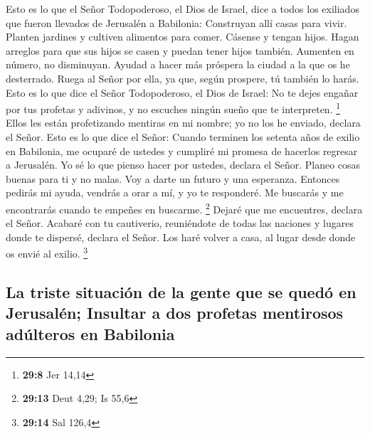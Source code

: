  Esto es lo que el Señor Todopoderoso, el Dios de Israel,
dice a todos los exiliados que fueron llevados de Jerusalén a Babilonia:
 Construyan allí casas para vivir. Planten jardines y
cultiven alimentos para comer.  Cásense y tengan hijos.
Hagan arreglos para que sus hijos se casen y puedan tener hijos también.
Aumenten en número, no disminuyan.  Ayudad a hacer más
próspera la ciudad a la que os he desterrado. Ruega al Señor por ella,
ya que, según prospere, tú también lo harás.  Esto es lo
que dice el Señor Todopoderoso, el Dios de Israel: No te dejes engañar
por tus profetas y adivinos, y no escuches ningún sueño que te
interpreten. \footnote{\textbf{29:8} Jer 14,14}  Ellos les
están profetizando mentiras en mi nombre; yo no los he enviado, declara
el Señor.  Esto es lo que dice el Señor: Cuando terminen
los setenta años de exilio en Babilonia, me ocuparé de ustedes y
cumpliré mi promesa de hacerlos regresar a Jerusalén.  Yo
sé lo que pienso hacer por ustedes, declara el Señor. Planeo cosas
buenas para ti y no malas. Voy a darte un futuro y una esperanza.
 Entonces pedirás mi ayuda, vendrás a orar a mí, y yo te
responderé.  Me buscarás y me encontrarás cuando te
empeñes en buscarme. \footnote{\textbf{29:13} Deut 4,29; Is 55,6}
 Dejaré que me encuentres, declara el Señor. Acabaré con
tu cautiverio, reuniéndote de todas las naciones y lugares donde te
dispersé, declara el Señor. Los haré volver a casa, al lugar desde donde
os envié al exilio. \footnote{\textbf{29:14} Sal 126,4}

\hypertarget{la-triste-situaciuxf3n-de-la-gente-que-se-queduxf3-en-jerusaluxe9n-insultar-a-dos-profetas-mentirosos-aduxfalteros-en-babilonia}{%
\subsection{La triste situación de la gente que se quedó en Jerusalén;
Insultar a dos profetas mentirosos adúlteros en
Babilonia}\label{la-triste-situaciuxf3n-de-la-gente-que-se-queduxf3-en-jerusaluxe9n-insultar-a-dos-profetas-mentirosos-aduxfalteros-en-babilonia}}

